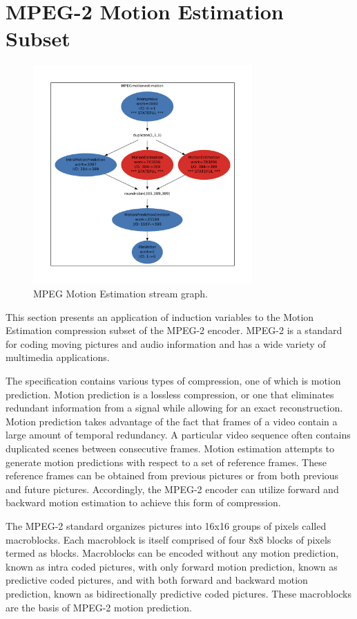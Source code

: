 \section{MPEG-2 Motion Estimation Subset}


\begin{figure}[t]
\includegraphics[width=3.3in]{work_estimate_mpeg_motionestimation.pdf}
\caption{MPEG Motion Estimation stream graph.\protect\label{fig:mpegMEgraph}}
\end{figure}


This section presents an application of induction variables to the Motion Estimation compression subset of the MPEG-2 encoder.  MPEG-2 is a standard for coding moving pictures and audio information and has a wide variety of multimedia applications.  

The specification contains various types of compression, one of which is motion prediction.  Motion prediction is a lossless compression, or one that eliminates redundant information from a signal while allowing for an exact reconstruction.  Motion prediction takes advantage of the fact that frames of a video contain a large amount of temporal redundancy.  A particular video sequence often contains duplicated scenes between consecutive frames.  Motion estimation attempts to generate motion predictions with respect to a set of reference frames.  These reference frames can be obtained from previous pictures or from both previous and future pictures.  Accordingly, the MPEG-2 encoder can utilize forward and backward motion estimation to achieve this form of compression.

The MPEG-2 standard organizes pictures into 16x16 groups of pixels called macroblocks.  Each macroblock is itself comprised of four 8x8 blocks of pixels termed as blocks.  Macroblocks can be encoded without any motion prediction, known as intra coded pictures, with only forward motion prediction, known as predictive coded pictures, and with both forward and backward motion prediction, known as bidirectionally predictive coded pictures.  These macroblocks are the basis of MPEG-2 motion prediction.  

